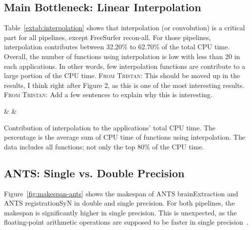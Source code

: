 \documentclass[conference]{IEEEtran}
\newcommand{\TG}[1]{\color{blue}\textsc{From Tristan: }#1\color{black}}
\begin{document}
\subsection{Main Bottleneck: Linear Interpolation}
Table~\ref{extab:interpolation} shows that interpolation (or convolution) is a critical part for all pipelines, except FreeSurfer recon-all. For those pipelines, interpolation contributes between 32.20\% to 62.70\% of the total CPU time. Overall, the number of functions using interpolation is low with less than 20 in each applications. In other words, few interpolation functions are contribute to a large portion of the CPU time. \TG{This should be moved up in the results, I think right after Figure 2, as this is one of the most interesting results.} \TG{Add a few sentences to explain why this is interesting.}
			
\begin{table}[h]
	\centering
	{\pipeline & \nfunc & \tablenum[round-precision=2]{\cputime}}
	\caption{Contribution of interpolation to the applications' total CPU time. The percentage is the average sum of CPU time of functions using interpolation. The data includes all functions; not only the top 80\% of the CPU time.}
	\label{extab:interpolation}
\end{table}
						
						
\subsection{ANTS: Single vs. Double Precision}
Figure~\ref{fig:makespan-ants} shows the makespan of ANTS brainExtraction and ANTS registrationSyN in double and single precision. For both pipelines, the makespan is significantly higher in single precision. This is unexpected, as the floating-point arithmetic operations are supposed to be faster in single precision~\cite{Wang2018-jv}.
\end{document}
